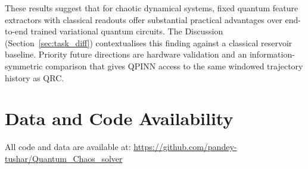 \documentclass[11pt,a4paper]{article}
\begin{document}
These results suggest that for chaotic dynamical systems, fixed quantum feature extractors with classical readouts offer substantial practical advantages over end-to-end trained variational quantum circuits. The Discussion (Section~\ref{sec:task_diff}) contextualises this finding against a classical reservoir baseline. Priority future directions are hardware validation and an information-symmetric comparison that gives QPINN access to the same windowed trajectory history as QRC.

\section*{Data and Code Availability}

All code and data are available at: \url{https://github.com/pandey-tushar/Quantum_Chaos_solver}
\end{document}
